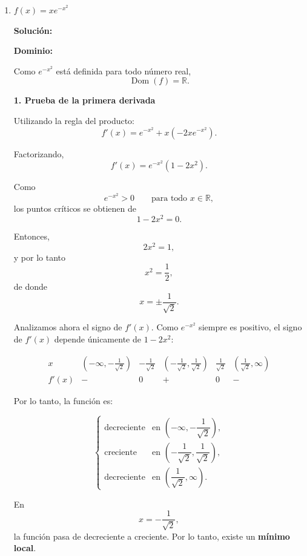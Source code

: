 \documentclass[12pt]{article}
\newcommand{\solucion}{%
    \vspace{0.8em}%
    \textbf{Solución:}%
}
\begin{document}
\begin{enumerate}[label=\alph*.-]
    \vspace{1cm}

    \setcounter{enumi}{3} %

    \item $f(x) = xe^{-x^2}$

    \solucion

    \textbf{Dominio:}

    Como $e^{-x^2}$ está definida para todo número real,
    \[
    \operatorname{Dom}(f)=\mathbb{R}.
    \]

    \textbf{1. Prueba de la primera derivada}

    Utilizando la regla del producto:
    \[
    f'(x)
    =
    e^{-x^2}
    +
    x\left(-2xe^{-x^2}\right).
    \]

    Factorizando,
    \[
    f'(x)
    =
    e^{-x^2}(1-2x^2).
    \]

    Como
    \[
    e^{-x^2}>0
    \qquad \text{para todo }x\in\mathbb{R},
    \]
    los puntos críticos se obtienen de
    \[
    1-2x^2=0.
    \]

    Entonces,
    \[
    2x^2=1,
    \]
    y por lo tanto
    \[
    x^2=\frac12,
    \]
    de donde
    \[
    x=\pm\frac{1}{\sqrt2}.
    \]

    Analizamos ahora el signo de $f'(x)$. Como
    $e^{-x^2}$ siempre es positivo, el signo de $f'(x)$ depende
    únicamente de $1-2x^2$:

    \[
    \begin{array}{c|ccccc}
    x &
    (-\infty,-\frac{1}{\sqrt2}) &
    -\frac{1}{\sqrt2} &
    (-\frac{1}{\sqrt2},\frac{1}{\sqrt2}) &
    \frac{1}{\sqrt2} &
    (\frac{1}{\sqrt2},\infty)
    \\
    \hline
    f'(x) & - & 0 & + & 0 & -
    \end{array}
    \]

    Por lo tanto, la función es:

    \[
    \begin{cases}
    \text{decreciente}
    & \text{en }\left(-\infty,-\dfrac{1}{\sqrt2}\right),\\[0.3cm]
    \text{creciente}
    & \text{en }\left(-\dfrac{1}{\sqrt2},\dfrac{1}{\sqrt2}\right),\\[0.3cm]
    \text{decreciente}
    & \text{en }\left(\dfrac{1}{\sqrt2},\infty\right).
    \end{cases}
    \]

    En
    \[
    x=-\frac{1}{\sqrt2},
    \]
    la función pasa de decreciente a creciente. Por lo tanto,
    existe un \textbf{mínimo local}.


\end{enumerate}
\end{document}

